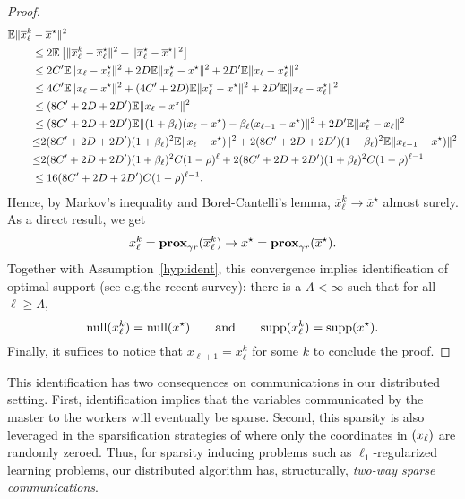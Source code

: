 \begin{proof}
\begin{align*}
    \mathbb{E} \|\overline x_{ {\ell}}^k &-  \overline {x}^\star\|^2  \\
    & \leq 2\mathbb{E}\left[\|\overline x_{ {\ell}}^k -  \overline x^{\star}_{ {\ell}}\|^2 + \|\overline x^{\star}_{ {\ell}} -  \overline{x}^\star\|^2\right] \\
    &\leq 2C' \mathbb{E} \|x_{\ell} - x_{ {\ell}}^\star\|^2 + 2D  \mathbb{E}\|x^{\star}_{ {\ell}} -  {x^\star}\|^2 + 2D'  \mathbb{E}\|x_\ell - {x}^\star_\ell\|^2\\
    &\leq 4C' \mathbb{E} \|x_{\ell} - x^\star\|^2  + (4C'+2D) \mathbb{E} \|x_{\ell}^\star - x^\star\|^2 + 2D'  \mathbb{E}\|x_\ell - {x}^\star_\ell\|^2  \\
    &\leq (8C'+2D+2D') \mathbb{E} \|x_{\ell} - x^\star\|^2 \\
    &\leq (8C'+2D+2D') \mathbb{E} \|(1+ {\beta}_\ell)({ {x_{\ell}}} -  {x^\star}) -  {\beta_\ell}({ {x_{\ell-1}}} -  {x^\star})\|^2 + 2D'  \mathbb{E}\|x^{\star}_{ {\ell}} -  {x_\ell}\|^2\\
    &{\leq} 2(8C'+2D+2D')(1+ {\beta}_\ell)^2\mathbb{E} \|{ {x_{\ell}}} -  {x^\star})\|^2  +2(8C'+2D+2D')(1+ {\beta}_\ell)^2 \mathbb{E}\|{ {x_{\ell-1}}} -  {x^\star})\|^2\\
    &{\leq} 2(8C'+2D+2D')(1+ {\beta}_\ell)^2 C (1-\rho)^\ell +2(8C'+2D+2D')(1+ {\beta}_\ell)^2 C (1-\rho)^{\ell-1} \\
    &\leq 16(8C'+2D+2D') C  (1-\rho)^{\ell-1}.
    \end{align*}
Hence, by Markov's inequality and Borel-Cantelli's lemma, $\overline x_{ {\ell}}^k \to  \overline {x}^\star$ almost surely. As a direct result, we get
$$
x_\ell^k = \mathbf{prox}_{\gamma r}( \overline x_{ {\ell}}^k ) \to {x}^\star = \mathbf{prox}_{\gamma r}(  \overline {x}^\star ).
$$
Together with Assumption~\ref{hyp:ident}, this convergence implies identification of optimal support (see e.g.\;the recent survey\;\cite[Cor.]{iutzeler2020SVAA}): there is a $\Lambda<\infty$ such that for all $\ell\geq \Lambda$,
$$
\mathrm{null}(x_\ell^k) = \mathrm{null}(x^\star) \qquad \text{and} \qquad \mathrm{supp}(x_\ell^k) = \mathrm{supp}(x^\star).
$$
Finally, it suffices to notice that $x_{\ell+1} = x_\ell^k$ for some $k$ to conclude the proof. 
\end{proof}

This identification has two consequences on communications in our distributed setting. First, identification implies that the variables communicated by the master to the workers will eventually be sparse. Second, this sparsity is also leveraged in the sparsification strategies of \recoalgo where only the coordinates in $\null(x_\ell)$ are randomly zeroed. Thus, for sparsity inducing problems such as $\ell_1$-regularized learning problems, our distributed algorithm has, structurally, \emph{two-way sparse communications}. 


